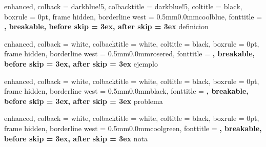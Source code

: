 %
    {enhanced,
    colback = darkblue!5,
    colbacktitle = darkblue!5,
    coltitle = black,
    boxrule = 0pt,
    frame hidden,
    borderline west = {0.5mm}{0.0mm}{coolblue},
    fonttitle = \bfseries\sffamily,
    breakable,
    before skip = 3ex,
    after skip = 3ex
}{definicion}

%
    {enhanced,
    colback = white,
    colbacktitle = white,
    coltitle = black,
    boxrule = 0pt,
    frame hidden,
    borderline west = {0.5mm}{0.0mm}{rosered},
    fonttitle = \bfseries\sffamily,
    breakable,
    before skip = 3ex,
    after skip = 3ex
}{ejemplo}

%
    {enhanced,
    colback = white,
    colbacktitle = white,
    coltitle = black,
    boxrule = 0pt,
    frame hidden,
    borderline west = {0.5mm}{0.0mm}{black},
    fonttitle = \bfseries\sffamily,
    breakable,
    before skip = 3ex,
    after skip = 3ex
}{problema}

%
    {enhanced,
    colback = white,
    colbacktitle = white,
    coltitle = black,
    boxrule = 0pt,
    frame hidden,
    borderline west = {0.5mm}{0.0mm}{coolgreen},
    fonttitle = \bfseries\sffamily,
    breakable,
    before skip = 3ex,
    after skip = 3ex
}{nota}

